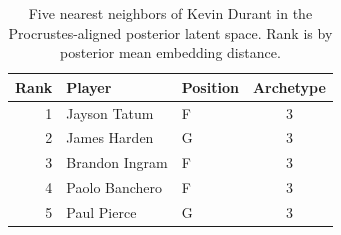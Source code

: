 \begin{table}[htbp]
  \centering\small
  \begin{tabular}{rllc}
    \toprule
    Rank & Player & Position & Archetype \\
    \midrule
    1 & Jayson Tatum & F & 3 \\
    2 & James Harden & G & 3 \\
    3 & Brandon Ingram & F & 3 \\
    4 & Paolo Banchero & F & 3 \\
    5 & Paul Pierce & G & 3 \\
    \bottomrule
  \end{tabular}
  \caption{Five nearest neighbors of Kevin Durant in the Procrustes-aligned posterior latent space. Rank is by posterior mean embedding distance.}
  \label{tab:Kevin_Durant_neighbors}
\end{table}

